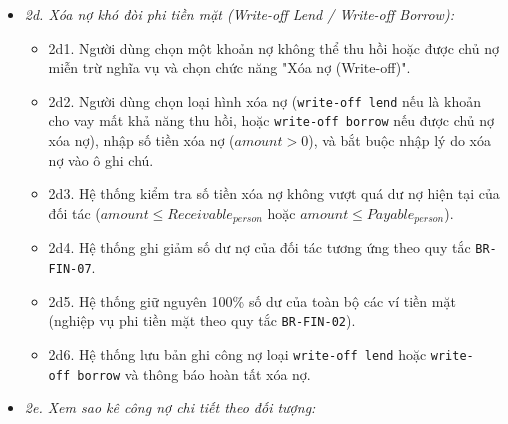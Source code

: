 \documentclass[11pt,a4paper]{article}
\providecommand{\tightlist}{
  \setlength{\itemsep}{0pt}\setlength{\parskip}{0pt}}
\begin{document}
\begin{itemize}
\begin{itemize}
    \begin{itemize}
    \tightlist
    \item
      2c1. Người dùng chọn một chủ nợ trong danh sách nợ phải trả và
      nhấn "Trả nợ".
    \item
      2c2. Hệ thống hiển thị dư nợ phải trả hiện tại và biểu mẫu trả nợ:
      Ngày trả, Số tiền trả, Ví trích tiền, Ghi chú.
    \item
      2c3. Người dùng nhập số tiền hoàn trả (\(amount > 0\)), chọn ví
      trích tiền và xác nhận.
    \item
      2c4. Hệ thống kiểm tra ràng buộc trần trả nợ
      (\(amount \le Payable_{person}\)) và kiểm tra số dư ví trích tiền
      (\(Balance_{wallet} \ge amount\)).
    \item
      2c5. Hệ thống trừ \(amount\) khỏi ví trích tiền, giảm nghĩa vụ nợ
      phải trả đối với chủ nợ:
      \(Payable_{person}(t) = Payable_{person}(t-1) - amount\).
    \item
      2c6. Hệ thống lưu bản ghi loại \texttt{repay} vào bảng
      \texttt{debt} và hiển thị thông báo thành công kèm dư nợ còn lại.
    \end{itemize}
  \item
    \emph{2d. Xóa nợ khó đòi phi tiền mặt (Write-off Lend / Write-off
    Borrow):}

    \begin{itemize}
    \tightlist
    \item
      2d1. Người dùng chọn một khoản nợ không thể thu hồi hoặc được chủ
      nợ miễn trừ nghĩa vụ và chọn chức năng "Xóa nợ (Write-off)".
    \item
      2d2. Người dùng chọn loại hình xóa nợ (\texttt{write-off\ lend}
      nếu là khoản cho vay mất khả năng thu hồi, hoặc
      \texttt{write-off\ borrow} nếu được chủ nợ xóa nợ), nhập số tiền
      xóa nợ (\(amount > 0\)), và bắt buộc nhập lý do xóa nợ vào ô ghi
      chú.
    \item
      2d3. Hệ thống kiểm tra số tiền xóa nợ không vượt quá dư nợ hiện
      tại của đối tác (\(amount \le Receivable_{person}\) hoặc
      \(amount \le Payable_{person}\)).
    \item
      2d4. Hệ thống ghi giảm số dư nợ của đối tác tương ứng theo quy tắc
      \texttt{BR-FIN-07}.
    \item
      2d5. Hệ thống giữ nguyên 100\% số dư của toàn bộ các ví tiền mặt
      (nghiệp vụ phi tiền mặt theo quy tắc \texttt{BR-FIN-02}).
    \item
      2d6. Hệ thống lưu bản ghi công nợ loại \texttt{write-off\ lend}
      hoặc \texttt{write-off\ borrow} và thông báo hoàn tất xóa nợ.
    \end{itemize}
  \item
    \emph{2e. Xem sao kê công nợ chi tiết theo đối tượng:}


\end{itemize}
\end{itemize}
\end{document}
